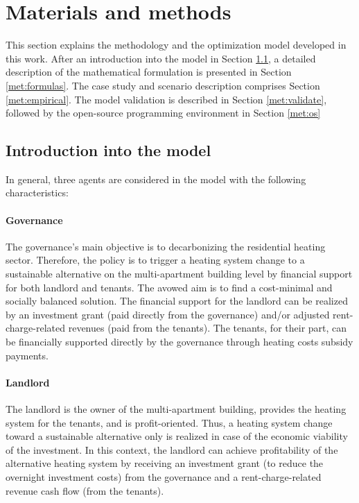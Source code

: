 \newpage
\section{Materials and methods}\label{methodology}
This section explains the methodology and the optimization model developed in this work. After an introduction into the model in Section \ref{met:intro}, a detailed description of the mathematical formulation is presented in Section \ref{met:formulas}. The case study and scenario description comprises Section \ref{met:empirical}. The model validation is described in Section \ref{met:validate}, followed by the open-source programming environment in Section \ref{met:os}

\subsection{Introduction into the model}\label{met:intro}
In general, three agents are considered in the model with the following characteristics:
\paragraph{Governance} The governance's main objective is to decarbonizing the residential heating sector. Therefore, the policy is to trigger a heating system change to a sustainable alternative on the multi-apartment building level by financial support for both landlord and tenants. The avowed aim is to find a cost-minimal and socially balanced solution. The financial support for the landlord can be realized by an investment grant (paid directly from the governance) and/or adjusted rent-charge-related revenues (paid from the tenants). The tenants, for their part, can be financially supported directly by the governance through heating costs subsidy payments. 
\paragraph{Landlord} The landlord is the owner of the multi-apartment building, provides the heating system for the tenants, and is profit-oriented. Thus, a heating system change toward a sustainable alternative only is realized in case of the economic viability of the investment. In this context, the landlord can achieve profitability of the alternative heating system by receiving an investment grant (to reduce the overnight investment costs) from the governance and a rent-charge-related revenue cash flow (from the tenants). 
